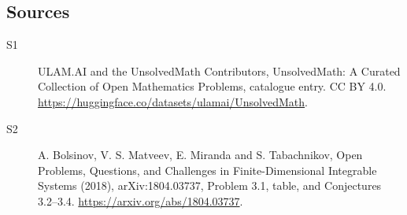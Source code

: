 \documentclass[11pt]{article}
\begin{document}
\subsection{Sources}
\begin{description}
\item[\hypertarget{source:statement:1}{S1}] ULAM.AI and the UnsolvedMath Contributors, UnsolvedMath: A Curated Collection of Open Mathematics Problems, catalogue entry. CC BY 4.0. \url{https://huggingface.co/datasets/ulamai/UnsolvedMath}.
\item[\hypertarget{source:statement:2}{S2}] A. Bolsinov, V. S. Matveev, E. Miranda and S. Tabachnikov, Open Problems, Questions, and Challenges in Finite-Dimensional Integrable Systems (2018), arXiv:1804.03737, Problem 3.1, table, and Conjectures 3.2–3.4. \url{https://arxiv.org/abs/1804.03737}.
\end{description}
\label{end:statement}
\end{document}
